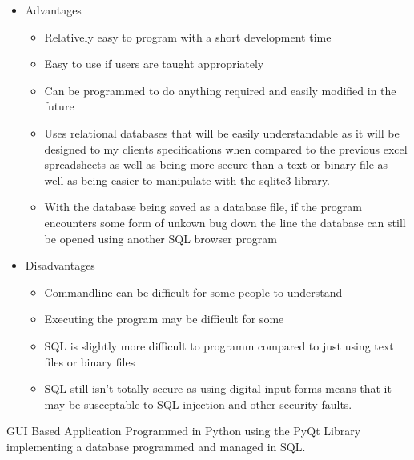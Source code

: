 \begin{itemize}
	\item Advantages
	\begin{itemize}
		\item Relatively easy to program with a short development time
		\item Easy to use if users are taught appropriately
		\item Can be programmed to do anything required and easily modified in the future
		\item Uses relational databases that will be easily understandable as it will be designed to my clients specifications when compared to the previous excel spreadsheets as well as being more secure than a text or binary file as well as being easier to manipulate with the sqlite3 library.
		\item With the database being saved as a database file, if the program encounters some form of unkown bug down the line the database can still be opened using another SQL browser program
	\end{itemize}
	\item Disadvantages
	\begin{itemize}
		\item Commandline can be difficult for some people to understand 
		\item Executing the program may be difficult for some
		\item SQL is slightly more difficult to programm compared to just using text files or binary files
	    \item SQL still isn't totally secure as using digital input forms means that it may be susceptable to SQL injection and other security faults.
	\end{itemize}
\end{itemize}

GUI Based Application Programmed in Python using the PyQt Library implementing a database programmed and managed in SQL.

